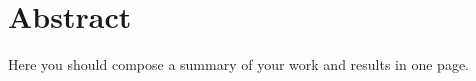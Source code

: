 \chapter*{Abstract}
\label{chap:abstract}
Here you should compose a summary of your work and results in one page.

